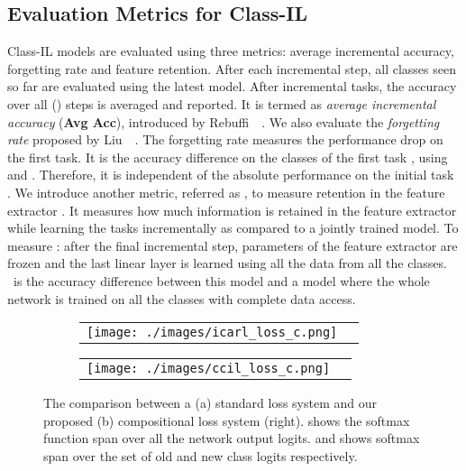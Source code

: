 \documentclass[final]{cvpr}
\newcommand{\cfr}{} \newcommand\todo[1]{(\textcolor{red}{TODO: #1})}
\begin{document}
\subsection{Evaluation Metrics for Class-IL}
\label{sec:classil_metrics}
Class-IL models are evaluated using three metrics: average incremental accuracy, forgetting rate and feature retention.
After each incremental step, all classes seen so far are evaluated using the latest model. After  incremental tasks, the accuracy   over all () steps is averaged and reported. It is termed as \textit{average incremental accuracy} (\textbf{Avg Acc}), introduced by Rebuffi~\etal~\cite{icarl}.
We also evaluate the\textit{ forgetting rate}  proposed by Liu~\etal~\cite{mnemonics}. The forgetting rate measures the performance drop on the first task. It is the accuracy difference on the classes of the first task , using  and . Therefore, it is independent of the absolute performance on the initial task . 
We introduce another metric, referred as \cfr, to measure retention in the feature extractor . It measures how much information is retained in the feature extractor while learning the tasks incrementally as compared to a jointly trained model. To measure \cfr: after the final incremental step, parameters of the feature extractor are frozen and the last linear layer is learned using all the data from all the classes. \cfr~is the accuracy difference between this model and a model where the whole network is trained on all the classes with complete data access. 

\begin{figure*}[t]
\centering
\begin{subfigure}[b]{.5\textwidth}
 \begin{tabular}{cc}
  \centering
  \texttt{[image: ./images/icarl\_loss\_c.png]}
  \end{tabular}
  \caption{}
  \label{fig:comb_softmax}
\end{subfigure}\begin{subfigure}[b]{.5\textwidth}
 \begin{tabular}{cc}
  \centering
  \texttt{[image: ./images/ccil\_loss\_c.png]}
  \end{tabular}
  \caption{}
  \label{fig:sep_softmax}
\end{subfigure}
\caption{The comparison between a (a) standard loss system and our proposed (b) compositional loss system (right).  shows the softmax function span over all the network output logits.  and  shows softmax span over the set of old and new class logits respectively. }
\label{fig:ccil_vs_icarl}
\end{figure*}
\end{document}
